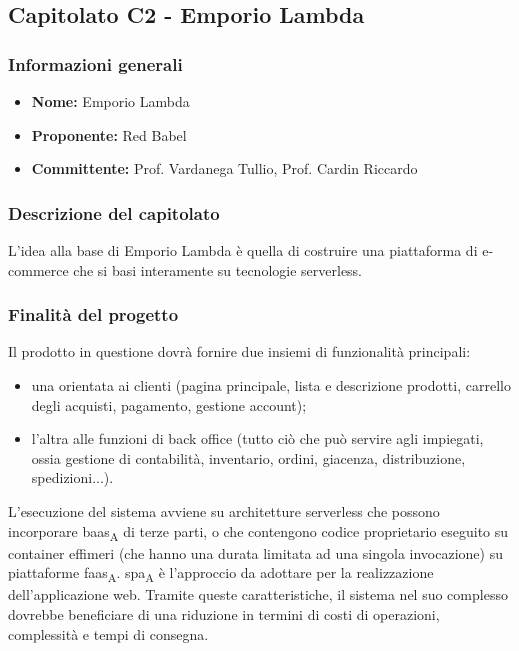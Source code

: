 \subsection{Capitolato C2 - Emporio Lambda}


\subsubsection{Informazioni generali}

\begin{itemize}
	\item{\textbf{Nome:}} Emporio Lambda
	\item{\textbf{Proponente:}} Red Babel
	\item{\textbf{Committente:}} Prof. Vardanega Tullio, Prof. Cardin Riccardo
\end{itemize}



\subsubsection{Descrizione del capitolato}

L'idea alla base di Emporio Lambda è quella di costruire una piattaforma di e-commerce che si basi interamente su tecnologie serverless.


\subsubsection{Finalità del progetto}

Il prodotto in questione dovrà fornire due insiemi di funzionalità principali:
\begin{itemize}
	\item una orientata ai clienti (pagina principale, lista e descrizione prodotti, carrello degli acquisti, pagamento, gestione account);
	\item l'altra alle funzioni di back office (tutto ciò che può servire agli impiegati, ossia gestione di contabilità, inventario, ordini, giacenza, distribuzione, spedizioni...).
\end{itemize}

L'esecuzione del sistema avviene su architetture serverless che possono incorporare baas\textsubscript{A} di terze parti, o che contengono codice proprietario eseguito su container effimeri (che hanno una durata limitata ad una singola invocazione) su piattaforme faas\textsubscript{A}. spa\textsubscript{A} è l'approccio da adottare per la realizzazione dell'applicazione web. Tramite queste caratteristiche, il sistema nel suo complesso dovrebbe beneficiare di una riduzione in termini di costi di operazioni, complessità e tempi di consegna.


